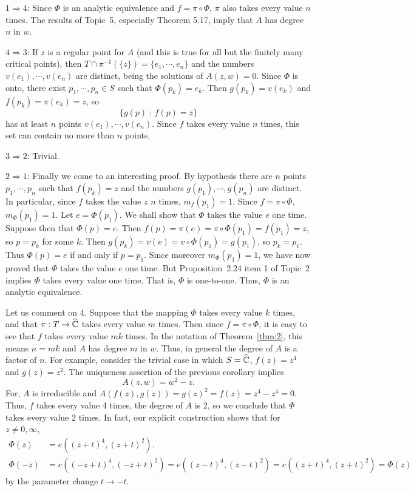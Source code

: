 \documentclass[a4paper,11pt]{article}
\begin{document}
\begin{myproof}
  $1 \Rightarrow 4$:  Since $\Phi$ is an analytic equivalence and $f =
  \pi \circ \Phi$, $\pi$ also takes every value $n$ times.  The
  results of Topic~5, especially Theorem 5.17, imply that $A$ has
  degree $n$ in $w$.

  $4 \Rightarrow 3$: If $z$ is a regular point for $A$ (and this is
  true for all but the finitely many critical points), then $T \cap
  \pi^{-1}(\{z\}) = \{e_1,\cdots, e_n\}$ and the numbers $v(e_1),
  \cdots, v(e_n)$ are distinct, being the solutions of $A(z, w) = 0$.
  Since $\Phi$ is onto, there exist $p_1, \cdots, p_n \in S$ such that
  $\Phi(p_k) = e_k$.  Then $g(p_k) = v(e_k)$ and $f(p_k) = \pi(e_k) =
  z$, so
  $$
  \{g(p) ~:~ f(p) = z\}
  $$
  has at least $n$ points $v(e_1), \cdots, v(e_n)$.  Since $f$ takes
  every value $n$ times, this set can contain no more than $n$
  points. 

  $3 \Rightarrow 2$: Trivial.

  $2 \Rightarrow 1$: Finally we come to an interesting proof.  By
  hypothesis there are $n$ points $p_1, \cdots, p_n$ such that $f(p_k)
  = z$ and the numbers $g(p_1), \cdots, g(p_n)$ are distinct.  In
  particular, since $f$ takes the value $z$ $n$ times, $m_f(p_1) =
  1$.  Since $f = \pi \circ \Phi$, $m_\Phi(p_1) = 1$.  Let $e =
  \Phi(p_1)$.  We shall show that $\Phi$ takes the value $e$ one
  time.  Suppose then that $\Phi(p) = e$.  Then $f(p) = \pi(e) = \pi
  \circ \Phi(p_1) = f(p_1) = z$, so $p = p_k$ for some $k$.  Then
  $g(p_k) = v(e) = v \circ \Phi(p_1) = g(p_1)$, so $p_k = p_1$.  Thus
  $\Phi(p) = e$ if and only if $p = p_1$.  Since moreover $m_\Phi(p_1)
  = 1$, we have now proved that $\Phi$ takes the value $e$ one time.
  But Proposition~2.24 item 1 of Topic~2 implies $\Phi$ takes every
  value one time.  That is, $\Phi$ is one-to-one.  Thus, $\Phi$ is an
  analytic equivalence.
\end{myproof}

Let us comment on 4.  Suppose that the mapping $\Phi$ takes every
value $k$ times, and that $\pi : T \to \widehat{{\mathbb C}}$ takes every
value $m$ times.  Then since $f = \pi \circ \Phi$, it is easy to see
that $f$ takes every value $mk$ times.  In the notation of
Theorem~\ref{thm:2}, this means $n=mk$ and $A$ has degree $m$ in $w$.
Thus, in general the degree of $A$ is a factor of $n$.  For example,
consider the trivial case in which $S = \widehat{{\mathbb C}}$, $f(z) = z^4$
and $g(z) = z^2$.  The uniqueness assertion of the previous corollary
implies
$$
A(z, w) = w^2 - z.
$$
For, $A$ is irreducible and $A(f(z), g(z)) = g(z)^2 = f(z) = z^4 - z^4
= 0$.  Thus, $f$ takes every value 4 times, the degree of $A$ is 2, so
we conclude that $\Phi$ takes every value 2 times.  In fact, our
explicit construction shows that for $z \ne 0, \infty$,
$$
\begin{aligned}
  \Phi(z) &= e((z+t)^4, (z+t)^2).\\
  \Phi(-z) &= e((-z+t)^4, (-z+t)^2) = e((z-t)^4, (z-t)^2)
  = e((z+t)^4, (z+t)^2) = \Phi(z)
\end{aligned}
$$
by the parameter change $t \to -t$.
\end{document}
